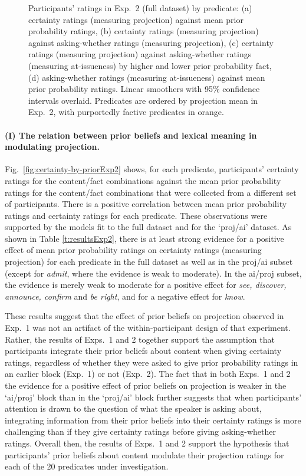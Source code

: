 \documentclass[11pt,fleqn]{article}
\newcommand{\6}{\mbox{$[\hspace*{-.6mm}[$}}
\newcommand{\9}{\mbox{$]\hspace*{-.6mm}]$}}
\begin{document}
\begin{figure}[h!]
\caption{Participants' ratings in Exp.~2 (full dataset) by predicate: (a) certainty ratings (measuring projection) against mean prior probability ratings, (b) certainty ratings (measuring projection) against asking-whether ratings (measuring projection), (c) certainty ratings (measuring projection) against asking-whether ratings (measuring at-issueness) by higher and lower prior probability fact, (d) asking-whether ratings (measuring at-issueness) against mean prior probability ratings. Linear smoothers with 95\% confidence intervals overlaid. Predicates are ordered by projection mean in Exp.~2, with purportedly factive predicates in orange.}\label{fig:results2}
\end{figure}

\paragraph{(I) The relation between prior beliefs and lexical meaning in modulating projection.}  Fig.~\ref{fig:certainty-by-priorExp2} shows, for each predicate, participants' certainty ratings for the content/fact combinations against the mean prior probability ratings for the content/fact combinations that were collected from a different set of participants. There is a positive correlation between mean prior probability ratings and certainty ratings for each predicate. These observations were supported by the models fit to the full dataset and for the `proj/ai' dataset. As shown in Table \ref{t:resultsExp2}, there is at least strong evidence for a positive effect of mean prior probability ratings on certainty ratings (measuring projection) for each predicate in the full dataset as well as in the proj/ai subset (except for {\em admit}, where the evidence is weak to moderate). In the ai/proj subset, the evidence is merely weak to moderate for a positive effect for {\em see, discover, announce, confirm} and {\em be right}, and for a negative effect for {\em know}. 

 These results suggest that the effect of prior beliefs on projection observed in Exp.~1 was not an artifact of the within-participant design of that experiment. Rather, the results of Exps.~1 and 2 together support the assumption that participants integrate their prior beliefs about content when giving certainty ratings, regardless of whether they were asked to give prior probability ratings in an earlier block (Exp.~1) or not (Exp.~2). The fact that in both Exps.~1 and 2 the evidence for a positive effect of prior beliefs on projection is weaker in the `ai/proj' block than in the `proj/ai' block further suggests that when participants' attention is drawn to the question of what the speaker is asking about, integrating information from their prior beliefs into their certainty ratings is more challenging than if they give certainty ratings before giving asking-whether ratings. Overall then, the results of Exps.~1 and 2 support the hypothesis that participants' prior beliefs about content modulate their projection ratings for each of the 20 predicates under investigation.
                          
\end{document}

